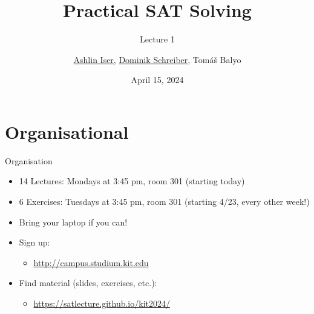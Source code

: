 \documentclass[t]{sdqbeamer}
\title[SAT Solving]{Practical SAT Solving}
\subtitle{Lecture 1}
\author{\underline{Ashlin Iser}, \underline{Dominik Schreiber}, Tom\'a\v{s} Balyo}
\date{April 15, 2024}
\begin{document}
\begin{frame}
	\thispagestyle{empty}
	\titlepage{}
\end{frame}

\section{Organisational}
\begin{frame}{Organisation}
	\begin{itemize}\setlength{\itemsep}{1em}
		\item 14 Lectures: Mondays at 3:45 pm, room 301 (starting today)
		\item 6 Exercises: Tuesdays at 3:45 pm, room 301 (starting 4/23, every other week!)
		\item Bring your laptop if you can!
		\item Sign up:
		\begin{itemize}
			\item \url{http://campus.studium.kit.edu}
		\end{itemize}
		\item Find material (slides, exercises, etc.):
		\begin{itemize}
			\item \url{https://satlecture.github.io/kit2024/}
		\end{itemize}
	\end{itemize}
\end{frame}
\end{document}
